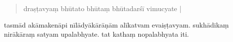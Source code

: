 \documentclass[12pt]{article}
\begin{document}
\begin{quote}
	draṣṭavyaṃ\footnoteB{
		draṣṭavyaṃ] \EDD ; draṣṭavya \MS
	} bhūtato bhūtaṃ bhūtadarśī vimucyate |
\end{quote}

\noindent tasmād akāmakenāpi nīlādyākārāṇām alīkatvam evaiṣṭavyam. sukhādikaṃ nirākāraṃ\footnoteB{
	nirākāraṃ] \MS\ \EDD ; rnam pa brdzun pa \TIB\ (alīkākāraṃ)
} satyam upalabhyate. tat kathaṃ nopalabhyata iti.

% 
 
\end{document}
